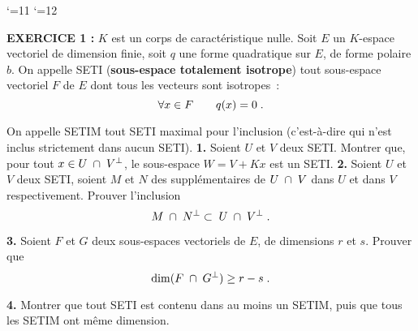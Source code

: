 \documentclass{article}
\begin{document}
\def\boxit#1#2{\setbox1=\hbox{\kern#1{#2}\kern#1}%
\dimen1=\ht1 \advance\dimen1 by #1 \dimen2=\dp1 \advance\dimen2 by #1
\setbox1=\hbox{\vrule height\dimen1 depth\dimen2\box1\vrule}%
\setbox1=\vbox{\hrule\box1\hrule}%
\advance\dimen1 by .4pt \ht1=\dimen1
\advance\dimen2 by .4pt \dp1=\dimen2 \box1\relax}


\catcode`\@=11
\def\system#1{\left\{\null\,\vcenter{\openup1\jot\m@th
\ialign{\strut\hfil$##$&$##$\hfil&&\enspace$##$\enspace&
\hfil$##$&$##$\hfil\crcr#1\crcr}}\right.}
\catcode`\@=12
\pagestyle{empty}
\def\lap#1{{\cal L}[#1]}
\def\DP#1#2{{\partial#1\s\partial#2}}
\def\cala{{\cal A}}
\def\fhat{\widehat{f}}
\let\wh=\widehat
\def\ftilde{\tilde{f}}











\def\lap#1{{\cal L}[#1]}
\def\DP#1#2{{\partial#1\s\partial#2}}



\overfullrule=0mm


\msk
{}
\bsk

{\bf EXERCICE 1 :}\msk
$K$ est un corps de caract\'eristique nulle.\ssk
Soit $E$ un $K$-espace vectoriel de dimension finie, soit $q$ une forme quadratique
sur $E$, de forme polaire $b$.\ssk
On appelle SETI ({\bf sous-espace totalement isotrope}) tout sous-espace
vectoriel $F$ de $E$ dont tous les vecteurs sont isotropes~:\vv
$$\forall x\in F\qquad q(x)=0\;.$$\par
On appelle SETIM tout SETI maximal pour l'inclusion (c'est-\`a-dire qui n'est inclus
strictement dans aucun SETI).\msk
{\bf 1.} Soient $U$ et $V$ deux SETI. Montrer que, pour tout $x\in U\;\cap\; V^\perp$,
le sous-espace $W=V+Kx$ est un SETI.\msk
{\bf 2.} Soient $U$ et $V$ deux SETI, soient $M$ et $N$ des suppl\'ementaires
de $U\;\cap\; V$ dans $U$ et dans $V$ respectivement. Prouver l'inclusion\vv
$$M\;\cap\; N^\perp\subset\; U\;\cap\; V^\perp\;.$$\par
{\bf 3.} Soient $F$ et $G$ deux sous-espaces vectoriels de $E$, de dimensions
$r$ et $s$. Prouver que\vvv
$$\dim(F\;\cap\; G^\perp)\geq r-s\;.$$\par
{\bf 4.} Montrer que tout SETI est contenu dans au moins un SETIM, puis que
tous les SETIM ont m\^eme dimension.
\end{document}
